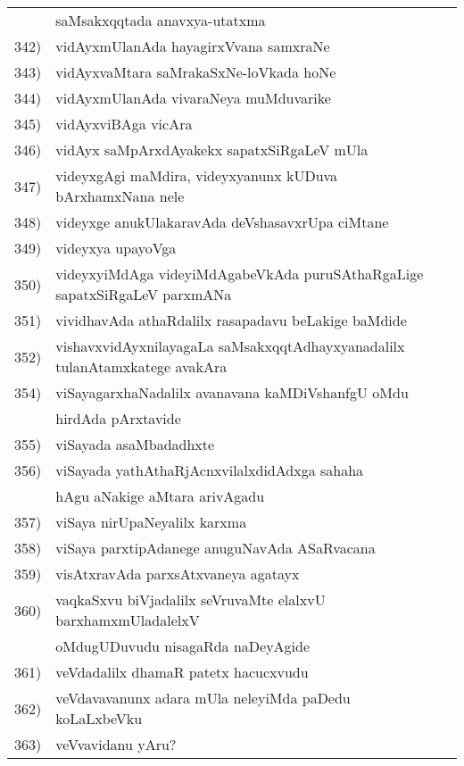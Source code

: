 {\begin{longtable}{@{}cp{7.4cm}r}
     & saMsakxqqtada anavxya-utatxma & \pageref{page36}\\ 
342) & vidAyxmUlanAda hayagirxVvana samxraNe & \pageref{page19}\\
343) & vidAyxvaMtara saMrakaSxNe-loVkada hoNe & \pageref{page50}\\
344) & vidAyxmUlanAda vivaraNeya muMduvarike & \pageref{page90}\\
345) & vidAyxviBAga vicAra & \pageref{page89}\\ 
346) & vidAyx saMpArxdAyakekx sapatxSiRgaLeV mUla & \pageref{page88}\\
347) & videyxgAgi maMdira, videyxyanunx kUDuva bArxhamxNana nele & \pageref{page86}\\
348) & videyxge anukUlakaravAda deVshasavxrUpa ciMtane & \pageref{page93}\\
349) & videyxya upayoVga & \pageref{page86}\\
350) & videyxyiMdAga videyiMdAgabeVkAda puruSAthaRgaLige sapatxSiRgaLeV parxmANa &  \pageref{page89}\\
351) & vividhavAda athaRdalilx rasapadavu beLakige baMdide & \pageref{page217}\\
352) & vishavxvidAyxnilayagaLa saMsakxqqtAdhayxyanadalilx tulanAtamxkatege avakAra & \pageref{page44}\\
354) & viSayagarxhaNadalilx avanavana kaMDiVshanfgU oMdu & \\
     & hirdAda pArxtavide & \pageref{page291}\\
355) &  viSayada asaMbadadhxte & \pageref{page115}\\
356) & viSayada yathAthaRjAcnxvilalxdidAdxga sahaha & \\
     & hAgu aNakige aMtara arivAgadu & \pageref{page194}\\
357) & viSaya nirUpaNeyalilx karxma & \pageref{page131}\\
358) & viSaya parxtipAdanege anuguNavAda ASaRvacana & \pageref{page128}\\
359) & visAtxravAda parxsAtxvaneya agatayx & \pageref{page27}\\ 
360) & vaqkaSxvu biVjadalilx seVruvaMte elalxvU barxhamxmUladalelxV & \\
     & oMdugUDuvudu nisagaRda naDeyAgide & \pageref{page247}\\
361) & veVdadalilx dhamaR patetx hacucxvudu & \pageref{page124}\\
362) & veVdavavanunx adara mUla neleyiMda paDedu koLaLxbeVku & \pageref{page135}\\
363) & veVvavidanu yAru? & \pageref{page133}\\

\end{longtable}}
